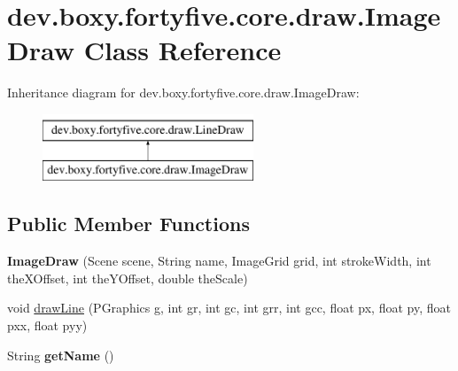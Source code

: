 \hypertarget{classdev_1_1boxy_1_1fortyfive_1_1core_1_1draw_1_1_image_draw}{
\section{dev.boxy.fortyfive.core.draw.ImageDraw Class Reference}
\label{d6/db8/classdev_1_1boxy_1_1fortyfive_1_1core_1_1draw_1_1_image_draw}
}
Inheritance diagram for dev.boxy.fortyfive.core.draw.ImageDraw:\begin{figure}[H]
\begin{center}
\leavevmode
\includegraphics[height=2.000000cm]{d6/db8/classdev_1_1boxy_1_1fortyfive_1_1core_1_1draw_1_1_image_draw}
\end{center}
\end{figure}
\subsection*{Public Member Functions}
\begin{DoxyCompactItemize}
\item 
\hypertarget{classdev_1_1boxy_1_1fortyfive_1_1core_1_1draw_1_1_image_draw_ae15b35540a2e8b5bcb43e052553abe5d}{
{\bfseries ImageDraw} (Scene scene, String name, ImageGrid grid, int strokeWidth, int theXOffset, int theYOffset, double theScale)}
\label{d6/db8/classdev_1_1boxy_1_1fortyfive_1_1core_1_1draw_1_1_image_draw_ae15b35540a2e8b5bcb43e052553abe5d}

\item 
void \hyperlink{classdev_1_1boxy_1_1fortyfive_1_1core_1_1draw_1_1_image_draw_a5943f1f5624b71ab0e0ac136d5cbcb96}{drawLine} (PGraphics g, int gr, int gc, int grr, int gcc, float px, float py, float pxx, float pyy)
\item 
\hypertarget{classdev_1_1boxy_1_1fortyfive_1_1core_1_1draw_1_1_image_draw_a924e7f847f6e1d5ab9fe7a34f5f56727}{
String {\bfseries getName} ()}
\label{d6/db8/classdev_1_1boxy_1_1fortyfive_1_1core_1_1draw_1_1_image_draw_a924e7f847f6e1d5ab9fe7a34f5f56727}

\end{DoxyCompactItemize}
